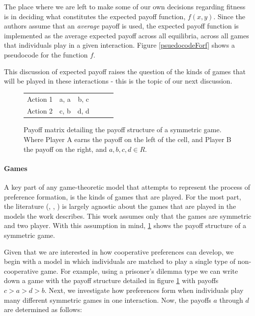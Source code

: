 \documentclass[11pt]{book}
\newcommand*{\np}{\par\noindent\newline}
\begin{document}
\np The place where we are left to make some of our own decisions regarding fitness is in deciding what constitutes the expected payoff function, $f(x,y)$.
Since the authors assume that an \textit{average} payoff is used, the expected payoff function is implemented as the average expected payoff across all equilibria, across all games that individuals play in a given interaction.
Figure \ref{psuedocodeForf} shows a pseudocode for the function $f$.

\np This discussion of expected payoff raises the question of the kinds of games that will be played in these interactions - this is the topic of our next discussion.

\begin{figure}[H]
	\vspace{30px}
	\centering
	\begin{tabular}{|l||*{5}{c|}}\hline
		\backslashbox{Player A}{Player B}
		&\makebox[7em]{Action 1}&\makebox[7em]{Action 2}\\\hline\hline
		Action 1 & a, a & b, c\\\hline
		Action 2 & c, b & d, d \\\hline
	\end{tabular}
	\caption{Payoff matrix detailing the payoff structure of a symmetric game. Where Player A earns the payoff on the left of the cell, and Player B the payoff on the right, and ${a, b, c, d} \in R$.}
	\label{symmetricGame}
	\vspace{20px}
\end{figure}
\paragraph{Games}
\np A key part of any game-theoretic model that attempts to represent the process of preference formation, is the kinds of games that are played.
For the most part, the literature (\citet{alger_generalization_2012}, \citet{alger_homo_2013}, \citet{newton_preferences_2017}) is largely agnostic about the games that are played in the models the work describes.
This work assumes only that the games are symmetric and two player. 
With this assumption in mind, \ref{symmetricGame} shows the payoff structure of a symmetric game.

\np Given that we are interested in how cooperative preferences can develop, we begin with a model in which individuals are matched to play a single type of non-cooperative game.
For example, using a prisoner's dilemma type we can write down a game with the payoff structure detailed in figure \ref{symmetricGame} with payoffs $c > a > d > b$.
Next, we investigate how preferences form when individuals play many different symmetric games in one interaction.
Now, the payoffs $a$ through $d$ are determined as follows:
\end{document}
